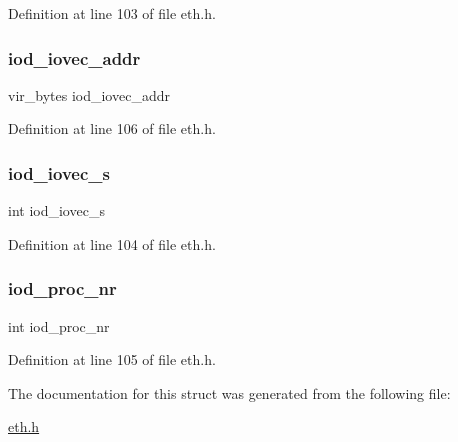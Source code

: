Definition at line 103 of file eth.\+h.

\hypertarget{structiovec__dat_ae91b470b60c7c67abdffccc6ac194612}{}\label{structiovec__dat_ae91b470b60c7c67abdffccc6ac194612} 
\subsubsection{\texorpdfstring{iod\+\_\+iovec\+\_\+addr}{iod\_iovec\_addr}}
{\footnotesize\ttfamily vir\+\_\+bytes iod\+\_\+iovec\+\_\+addr}



Definition at line 106 of file eth.\+h.

\hypertarget{structiovec__dat_a90d7c9e55a65072be54bab5e5a2ec677}{}\label{structiovec__dat_a90d7c9e55a65072be54bab5e5a2ec677} 
\subsubsection{\texorpdfstring{iod\+\_\+iovec\+\_\+s}{iod\_iovec\_s}}
{\footnotesize\ttfamily int iod\+\_\+iovec\+\_\+s}



Definition at line 104 of file eth.\+h.

\hypertarget{structiovec__dat_aee40e017091b0b633b07d95d0bc9b0c9}{}\label{structiovec__dat_aee40e017091b0b633b07d95d0bc9b0c9} 
\subsubsection{\texorpdfstring{iod\+\_\+proc\+\_\+nr}{iod\_proc\_nr}}
{\footnotesize\ttfamily int iod\+\_\+proc\+\_\+nr}



Definition at line 105 of file eth.\+h.



The documentation for this struct was generated from the following file\+:\begin{DoxyCompactItemize}
\item 
\hyperlink{eth_8h}{eth.\+h}\end{DoxyCompactItemize}
